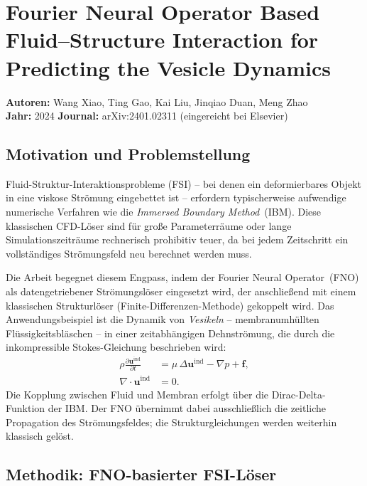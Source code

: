 \documentclass[a4paper,12pt]{article}
\begin{document}
\section*{Fourier Neural Operator Based Fluid--Structure Interaction for
Predicting the Vesicle Dynamics}

\textbf{Autoren:} Wang Xiao, Ting Gao, Kai Liu, Jinqiao Duan, Meng Zhao\\
\textbf{Jahr:} 2024 \quad \textbf{Journal:} arXiv:2401.02311 (eingereicht bei Elsevier)

\subsection*{Motivation und Problemstellung}

Fluid-Struktur-Interaktionsprobleme (FSI) -- bei denen ein deformierbares
Objekt in eine viskose Strömung eingebettet ist -- erfordern typischerweise
aufwendige numerische Verfahren wie die \emph{Immersed Boundary Method}~(IBM).
Diese klassischen CFD-Löser sind für große Parameterräume oder lange
Simulationszeiträume rechnerisch prohibitiv teuer, da bei jedem Zeitschritt
ein vollständiges Strömungsfeld neu berechnet werden muss.

Die Arbeit begegnet diesem Engpass, indem der Fourier Neural Operator~(FNO)
als datengetriebener Strömungslöser eingesetzt wird, der anschließend mit
einem klassischen Strukturlöser (Finite-Differenzen-Methode) gekoppelt wird.
Das Anwendungsbeispiel ist die Dynamik von \emph{Vesikeln} -- membranumhüllten
Flüssigkeitsbläschen -- in einer zeitabhängigen Dehnströmung, die durch die
inkompressible Stokes-Gleichung beschrieben wird:
\begin{align}
    \rho \frac{\partial \mathbf{u}^{\text{ind}}}{\partial t}
    &= \mu \,\Delta \mathbf{u}^{\text{ind}} - \nabla p + \mathbf{f}, \\
    \nabla \cdot \mathbf{u}^{\text{ind}} &= 0.
\end{align}
Die Kopplung zwischen Fluid und Membran erfolgt über die Dirac-Delta-Funktion
der IBM.  Der FNO übernimmt dabei ausschließlich die zeitliche Propagation des
Strömungsfeldes; die Strukturgleichungen werden weiterhin klassisch gelöst.

\subsection*{Methodik: FNO-basierter FSI-Löser}
\end{document}
